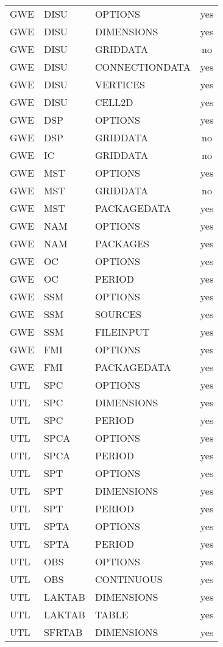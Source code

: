 \begin{longtable}{p{1.5cm} p{1.5cm} p{3cm} c}
\hline
GWE & DISU & OPTIONS & yes \\ 
GWE & DISU & DIMENSIONS & yes \\ 
GWE & DISU & GRIDDATA & no \\ 
GWE & DISU & CONNECTIONDATA & yes \\ 
GWE & DISU & VERTICES & yes \\ 
GWE & DISU & CELL2D & yes \\ 
\hline
GWE & DSP & OPTIONS & yes \\ 
GWE & DSP & GRIDDATA & no \\ 
\hline
GWE & IC & GRIDDATA & no \\ 
\hline
GWE & MST & OPTIONS & yes \\ 
GWE & MST & GRIDDATA & no \\ 
GWE & MST & PACKAGEDATA & yes \\ 
\hline
GWE & NAM & OPTIONS & yes \\ 
GWE & NAM & PACKAGES & yes \\ 
\hline
GWE & OC & OPTIONS & yes \\ 
GWE & OC & PERIOD & yes \\ 
\hline
GWE & SSM & OPTIONS & yes \\ 
GWE & SSM & SOURCES & yes \\ 
GWE & SSM & FILEINPUT & yes \\ 
\hline
GWE & FMI & OPTIONS & yes \\ 
GWE & FMI & PACKAGEDATA & yes \\ 
\hline
UTL & SPC & OPTIONS & yes \\ 
UTL & SPC & DIMENSIONS & yes \\ 
UTL & SPC & PERIOD & yes \\ 
\hline
UTL & SPCA & OPTIONS & yes \\ 
UTL & SPCA & PERIOD & yes \\ 
\hline
UTL & SPT & OPTIONS & yes \\ 
UTL & SPT & DIMENSIONS & yes \\ 
UTL & SPT & PERIOD & yes \\ 
\hline
UTL & SPTA & OPTIONS & yes \\ 
UTL & SPTA & PERIOD & yes \\ 
\hline
UTL & OBS & OPTIONS & yes \\ 
UTL & OBS & CONTINUOUS & yes \\ 
\hline
UTL & LAKTAB & DIMENSIONS & yes \\ 
UTL & LAKTAB & TABLE & yes \\ 
\hline
UTL & SFRTAB & DIMENSIONS & yes \\ 

\end{longtable}
